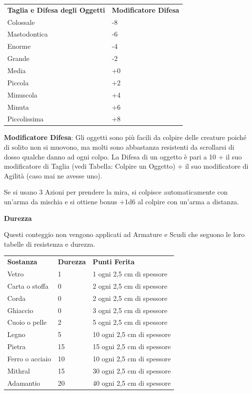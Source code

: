 \documentclass[a4paper,11pt,twoside,openany]{book}
\begin{document}
\begin{tabular}{ll}
	\toprule
	\textbf{Taglia e Difesa degli Oggetti} & \textbf{Modificatore Difesa}\\
	Colossale                              & -8\\
	Mastodontica                           & -6\\
	Enorme                                 & -4\\
	Grande                                 & -2\\
	Media                                  & +0\\
	Piccola                                & +2\\
	Minuscola                              & +4\\
	Minuta                                 & +6\\
	Piccolissima                           & +8\\
\end{tabular}

\bigskip

\textbf{Modificatore Difesa}: Gli oggetti sono più facili da colpire delle creature poiché di solito non si muovono, ma molti sono abbastanza resistenti da scrollarsi di dosso qualche danno ad ogni colpo. La Difesa di un oggetto è pari a 10 + il suo modificatore di Taglia (vedi Tabella: Colpire un Oggetto) + il suo modificatore di Agilità (caso mai ne avesse uno).

Se si usano 3 Azioni per prendere la mira, si colpisce automaticamente con un'arma da mischia e si ottiene bonus +1d6 al colpire con un'arma a distanza.

\textbf{Durezza}

Questi conteggio non vengono applicati ad Armature e Scudi che seguono le loro tabelle di resistenza e durezza.

\bigskip

\begin{tabular}{lll}
	\toprule
	\textbf{Sostanza} & \textbf{Durezza} & \textbf{Punti Ferita} \\
	Vetro             & 1                & 1 ogni 2,5 cm di spessore\\
	Carta o stoffa    & 0                & 2 ogni 2,5 cm di spessore\\
	Corda             & 0                & 2 ogni 2,5 cm di spessore\\
	Ghiaccio          & 0                & 3 ogni 2,5 cm di spessore\\
	Cuoio o pelle     & 2                & 5 ogni 2,5 cm di spessore\\
	Legno             & 5                & 10 ogni 2,5 cm di spessore\\
	Pietra            & 15               & 15 ogni 2,5 cm di spessore\\
	Ferro o acciaio   & 10               & 10 ogni 2,5 cm di spessore\\
	Mithral           & 15               & 30 ogni 2,5 cm di spessore\\
	Adamantio         & 20               & 40 ogni 2,5 cm di spessore\\
\end{tabular}
\end{document}
